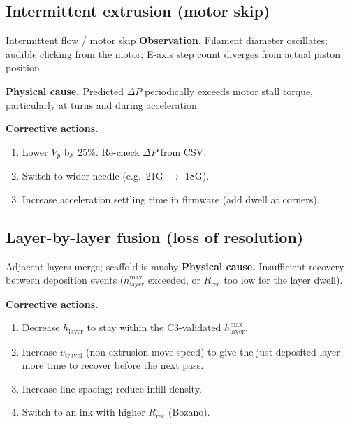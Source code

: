 \documentclass[11pt,a4paper]{article}
\begin{document}
\subsection{Intermittent extrusion (motor skip)}

\begin{failurebox}{Intermittent flow / motor skip}
\textbf{Observation.} Filament diameter oscillates; audible clicking
from the motor; E-axis step count diverges from actual piston position.

\textbf{Physical cause.} Predicted $\Delta P$ periodically exceeds motor
stall torque, particularly at turns and during acceleration.

\textbf{Corrective actions.}
\begin{enumerate}[leftmargin=1.6em,itemsep=1pt]
\item Lower $V_p$ by 25\%. Re-check $\Delta P$ from CSV.
\item Switch to wider needle (e.g.\ 21G $\to$ 18G).
\item Increase acceleration settling time in firmware (add dwell at corners).
\end{enumerate}
\end{failurebox}

\subsection{Layer-by-layer fusion (loss of resolution)}

\begin{failurebox}{Adjacent layers merge; scaffold is mushy}
\textbf{Physical cause.} Insufficient recovery between deposition
events ($h_\mathrm{layer}^{\max}$ exceeded, or $R_\mathrm{rec}$ too
low for the layer dwell).

\textbf{Corrective actions.}
\begin{enumerate}[leftmargin=1.6em,itemsep=1pt]
\item Decrease $h_\mathrm{layer}$ to stay within the C3-validated
  $h_\mathrm{layer}^{\max}$.
\item Increase $v_\mathrm{travel}$ (non-extrusion move speed) to give
  the just-deposited layer more time to recover before the next pass.
\item Increase line spacing; reduce infill density.
\item Switch to an ink with higher $R_\mathrm{rec}$ (Bozano).
\end{enumerate}
\end{failurebox}
\end{document}
